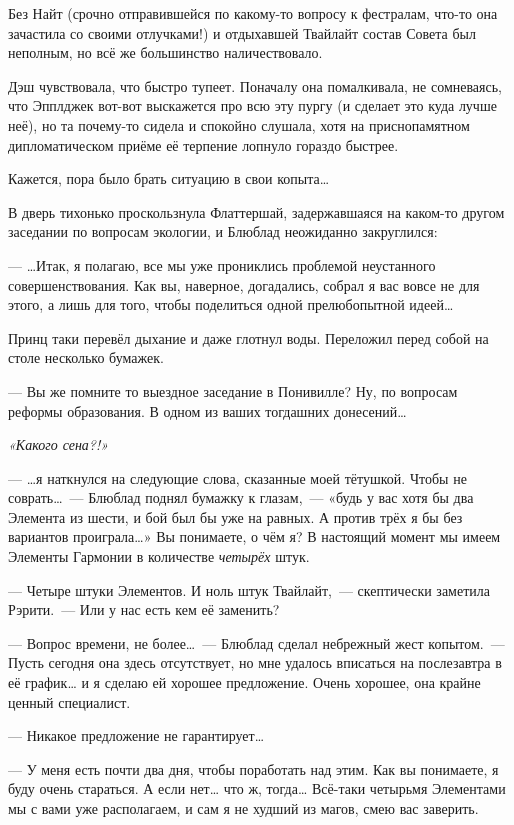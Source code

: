 \documentclass[twoside,a5paper,12pt]{extbook}
\begin{document}
Без Найт (срочно отправившейся по какому-то вопросу к фестралам, что-то она зачастила со своими отлучками!) и отдыхавшей Твайлайт состав Совета был неполным, но всё же большинство наличествовало.

Дэш чувствовала, что быстро тупеет. Поначалу она помалкивала, не сомневаясь, что Эпплджек вот-вот выскажется про всю эту пургу (и сделает это куда лучше неё), но та почему-то сидела и спокойно слушала, хотя на приснопамятном дипломатическом приёме её терпение лопнуло гораздо быстрее.

Кажется, пора было брать ситуацию в свои копыта…

В дверь тихонько проскользнула Флаттершай, задержавшаяся на каком-то другом заседании по вопросам экологии, и Блюблад неожиданно закруглился:

— …Итак, я полагаю, все мы уже прониклись проблемой неустанного совершенствования. Как вы, наверное, догадались, собрал я вас вовсе не для этого, а лишь для того, чтобы поделиться одной прелюбопытной идеей…

Принц таки перевёл дыхание и даже глотнул воды. Переложил перед собой на столе несколько бумажек.

— Вы же помните то выездное заседание в Понивилле? Ну, по вопросам реформы образования. В одном из ваших тогдашних донесений…

\textit{«Какого сена?!»
}

— …я наткнулся на следующие слова, сказанные моей тётушкой. Чтобы не соврать… — Блюблад поднял бумажку к глазам, — «будь у вас хотя бы два Элемента из шести, и бой был бы уже на равных. А против трёх я бы без вариантов проиграла…» Вы понимаете, о чём я? В настоящий момент мы имеем Элементы Гармонии в количестве \textit{четырёх} штук.

— Четыре штуки Элементов. И ноль штук Твайлайт, — скептически заметила Рэрити. — Или у нас есть кем её заменить?

— Вопрос времени, не более… — Блюблад сделал небрежный жест копытом. — Пусть сегодня она здесь отсутствует, но мне удалось вписаться на послезавтра в её график… и я сделаю ей хорошее предложение. Очень хорошее, она крайне ценный специалист.

— Никакое предложение не гарантирует…

— У меня есть почти два дня, чтобы поработать над этим. Как вы понимаете, я буду очень стараться. А если нет… что ж, тогда… Всё-таки четырьмя Элементами мы с вами уже располагаем, и сам я не худший из магов, смею вас заверить.
\end{document}
